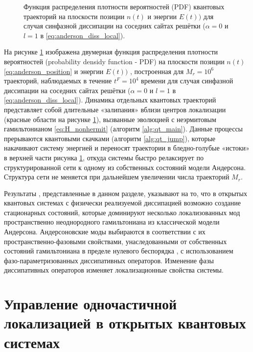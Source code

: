 \begin{figure}[ht]
	\caption{
		Функция распределения плотности вероятностей (PDF) квантовых траекторий на плоскости позиции \(n(t)\) и энергии \(E(t))\) для случая синфазной диссипации на соседних сайтах решётки (\(\alpha=0\) и \(l=1\) в \cref{eq:anderson_diss_local}).
	}
	\label{fig:anderson_qj_1}
\end{figure}

На рисунке \cref{fig:anderson_qj_1} изображена двумерная функция распределения плотности вероятностей (probability densidy function - PDF) на плоскости позиции \(n(t)\) \cref{eq:anderson_position} и энергии \(E(t))\) , построенная для \(M_r=10^6\) траекторий, наблюдаемых в течение \(t^F=10^4\) времени для случая синфазной диссипации на соседних сайтах решётки (\(\alpha=0\) и \(l=1\) в \cref{eq:anderson_diss_local}). Динамика отдельных квантовых траекторий представляет собой длительные «залипания» вблизи центров локализации (красные области на рисунке \cref{fig:anderson_qj_1}), вызванные эволюцией с неэрмитовым гамильтонианом \cref{eq:H_nonhermit} (алгоритм \ref{alg:qt_main}). Данные процессы прерываются квантовыми скачками (алгоритм \ref{alg:qt_jump}), которые накачивают систему энергией и переносят траектории в бледно-голубые «истоки» в верхней части рисунка \cref{fig:anderson_qj_1}, откуда системы быстро релаксирует по структурированной сети к одному из собственных состояний модели Андерсона. Структура сети не меняется при дальнейшем увеличении числа траекторий \(M_r\).

Результаты \cite{Yusipov2017}, представленные в данном разделе, указывают на то, что в открытых квантовых системах с физически реализуемой диссипацией возможно создание стационарных состояний, которые доминируют несколько локализованных мод пространственно неоднородного гамильтониана из классической модели Андерсона. Андерсоновские моды выбираются в соответствии с их пространственно-фазовыми свойствами, унаследованными от собственных состояний гамильтониана в пределе нулевого беспорядка \cite{Ishii1973}, с использованием фазо-параметризованных диссипативных операторов. Изменение фазы диссипативных операторов изменяет локализационные свойства системы.
 
\section{Управление одночастичной локализацией в открытых квантовых системах}\label{sec:ch1/epjb}





